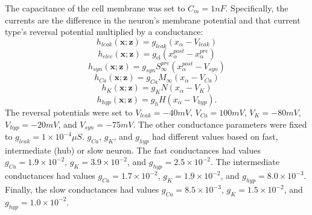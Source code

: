 \documentclass[11pt]{article}
\begin{document}
The capacitance of the cell membrane was set to $C_m = 1nF$. Specifically, the currents are the difference in the neuron's membrane potential and that current type's reversal potential multiplied by a conductance:
\begin{equation}  h_{leak}(\mathbf{x}; \mathbf{z}) = g_{leak} (x_\alpha - V_{leak}) 
\end{equation} 
\begin{equation}  h_{elec}(\mathbf{x}; \mathbf{z}) = g_{\text{el}} (x_\alpha^{post} - x_\alpha^{pre})
\end{equation} 
\begin{equation}  h_{syn}(\mathbf{x}; \mathbf{z}) = g_{syn} S_\infty^{pre} (x_\alpha^{post} - V_{syn}) \end{equation} 
\begin{equation}  h_{Ca}(\mathbf{x}; \mathbf{z}) = g_{Ca} M_\infty (x_\alpha - V_{Ca}) 
\end{equation} 
\begin{equation}  h_K(\mathbf{x}; \mathbf{z}) = g_K N (x_\alpha - V_K) 
\end{equation} 
\begin{equation}  h_{hyp}(\mathbf{x}; \mathbf{z}) = g_h H(x_\alpha - V_{hyp}).
\end{equation} 
The reversal potentials were set to $V_{leak} = -40mV$, $V_{Ca} = 100mV$, $V_K = -80mV$, $V_{hyp} = -20mV$, and $V_{syn} = -75mV$.  
The other conductance parameters were fixed to $g_{leak} = 1 \times 10^{-4} \mu S$. $g_{Ca}$, $g_{K}$, and $g_{hyp}$ had different values based on fast, intermediate (hub) or slow neuron.  
The fast conductances had values $g_{Ca} = 1.9 \times 10^{-2}$, $ g_K = 3.9 \times 10^{-2} $, and $ g_{hyp} = 2.5 \times 10^{-2} $.  
The intermediate conductances had values $g_{Ca} = 1.7 \times 10^{-2}$, $ g_K = 1.9 \times 10^{-2} $, and $ g_{hyp} = 8.0 \times 10^{-3} $.  
Finally, the slow conductances had values $g_{Ca} = 8.5 \times 10^{-3}$, $ g_K = 1.5 \times 10^{-2} $, and $ g_{hyp} = 1.0 \times 10^{-2} $.
\end{document}
